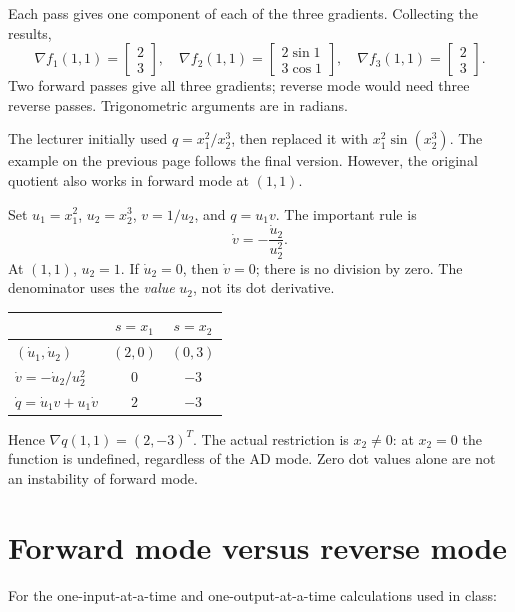 Each pass gives one component of each of the three gradients. Collecting the results,
\[
 \boxed{\nabla f_1(1,1)=\begin{bmatrix}2\\3\end{bmatrix},\quad
 \nabla f_2(1,1)=\begin{bmatrix}2\sin1\\3\cos1\end{bmatrix},\quad
 \nabla f_3(1,1)=\begin{bmatrix}2\\3\end{bmatrix}.}
\]
Two forward passes give all three gradients; reverse mode would need three reverse passes. Trigonometric arguments are in radians.

\clearpage
\begin{remark}
The lecturer initially used $q=x_1^2/x_2^3$, then replaced it with $x_1^2\sin(x_2^3)$. The example on the previous page follows the final version. However, the original quotient also works in forward mode at $(1,1)$.

Set $u_1=x_1^2$, $u_2=x_2^3$, $v=1/u_2$, and $q=u_1v$. The important rule is
\[
 \boxed{\dot v=-\frac{\dot u_2}{u_2^2}.}
\]
At $(1,1)$, $u_2=1$. If $\dot u_2=0$, then $\dot v=0$; there is no division by zero. The denominator uses the \emph{value} $u_2$, not its dot derivative.
\begin{center}
\renewcommand{\arraystretch}{1.3}
\begin{tabular}{lcc}
\toprule
 & $s=x_1$ & $s=x_2$\\
\midrule
$(\dot u_1,\dot u_2)$ & $(2,0)$ & $(0,3)$\\
$\dot v=-\dot u_2/u_2^2$ & $0$ & $-3$\\
$\dot q=\dot u_1v+u_1\dot v$ & $2$ & $-3$\\
\bottomrule
\end{tabular}
\end{center}
Hence $\nabla q(1,1)=(2,-3)^T$. The actual restriction is $x_2\ne0$: at $x_2=0$ the function is undefined, regardless of the AD mode. Zero dot values alone are not an instability of forward mode.
\end{remark}

\section{Forward mode versus reverse mode}
For the one-input-at-a-time and one-output-at-a-time calculations used in class:


